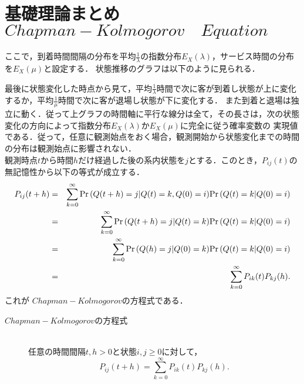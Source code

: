 \documentclass[a4j,papersize,disablejfam,slide,14pt]{jsarticle}
\def\cprob#1#2{\mbox{${\rm Pr} \left( #1 | #2 \right)$}} %
\begin{document}
\newpage
\section{基礎理論まとめ \qquad $Chapman-Kolmogorov\quad Equation$}
	ここで，到着時間間隔の分布を平均$\frac{1}{\lambda}$の指数分布$E_X(\lambda)$，サービス時間の分布を$E_X(\mu)$と設定する．
    状態推移のグラフは以下のように見られる．
    \begin{picture}
    	
    \end{picture}
    最後に状態変化した時点から見て，平均$\frac{1}{\lambda}$時間で次に客が到着し状態が上に変化するか，平均$\frac{1}{\mu}$時間で次に客が退場し状態が下に変化する．
    また到着と退場は独立に動く．従って上グラフの時間軸に平行な線分は全て，その長さは，次の状態変化の方向によって指数分布$E_X(\lambda)$か$E_X(\mu)$に完全に従う確率変数の
    実現値である．従って，任意に観測始点をおく場合，観測開始から状態変化までの時間の分布は観測始点に影響されない．\\
    観測時点$t$から時間$h$だけ経過した後の系内状態を$j$とする．このとき，$P_{ij}(t)$の無記憶性から以下の等式が成立する．
    \begin{eqnarray}
    	P_{ij}(t+h) &=& \sum_{k=0}^{\infty} \cprob{Q(t+h) = j}{Q(t) = k, Q(0) = i}\cprob{Q(t) = k}{Q(0) = i} \\
        &=& \sum_{k=0}^{\infty} \cprob{Q(t+h) = j}{Q(t) = k}\cprob{Q(t) = k}{Q(0) = i} \\
        &=& \sum_{k=0}^{\infty} \cprob{Q(h) = j}{Q(0) = k}\cprob{Q(t) = k}{Q(0) = i} \\
        &=& \sum_{k=0}^{\infty} P_{ik}(t)P_{kj}(h).
    \end{eqnarray}
    これが $Chapman-Kolmogorov$の方程式である．
    \begin{screen}
    	\begin{description}
        	\item[$Chapman-Kolmogorov$の方程式]\mbox{}\\
            	任意の時間間隔$t,h > 0$と状態$i,j \geq 0$に対して，
                \[
            		P_{ij}(t+h) = \sum_{k=0}^{\infty} P_{ik}(t)P_{kj}(h).
                \]
        \end{description}
    \end{screen}

\newpage
\end{document}
